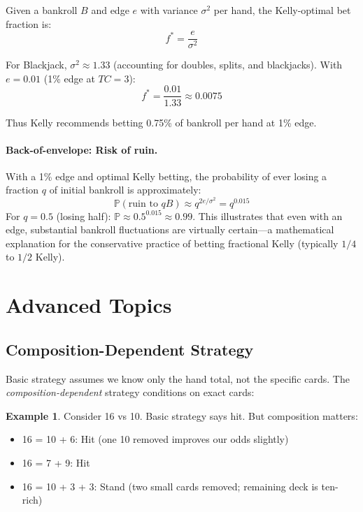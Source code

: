 \documentclass[11pt,a4paper]{article}
\theoremstyle{definition}
\newtheorem{example}[theorem]{Example}
\newcommand{\Prob}{\mathbb{P}}
\begin{document}
Given a bankroll $B$ and edge $e$ with variance $\sigma^2$ per hand, the Kelly-optimal bet fraction is:
\begin{equation}
f^* = \frac{e}{\sigma^2}
\end{equation}

For Blackjack, $\sigma^2 \approx 1.33$ (accounting for doubles, splits, and blackjacks). With $e = 0.01$ (1\% edge at $TC = 3$):
\[
f^* = \frac{0.01}{1.33} \approx 0.0075
\]

Thus Kelly recommends betting 0.75\% of bankroll per hand at 1\% edge.

\paragraph{Back-of-envelope: Risk of ruin.} With a 1\% edge and optimal Kelly betting, the probability of ever losing a fraction $q$ of initial bankroll is approximately:
\[
\Prob(\text{ruin to } qB) \approx q^{2e/\sigma^2} = q^{0.015}
\]
For $q = 0.5$ (losing half): $\Prob \approx 0.5^{0.015} \approx 0.99$. This illustrates that even with an edge, substantial bankroll fluctuations are virtually certain---a mathematical explanation for the conservative practice of betting fractional Kelly (typically $1/4$ to $1/2$ Kelly).

\section{Advanced Topics}

\subsection{Composition-Dependent Strategy}

Basic strategy assumes we know only the hand total, not the specific cards. The \textit{composition-dependent} strategy conditions on exact cards:

\begin{example}
Consider 16 vs 10. Basic strategy says hit. But composition matters:
\begin{itemize}[nosep]
\item 16 = 10 + 6: Hit (one 10 removed improves our odds slightly)
\item 16 = 7 + 9: Hit
\item 16 = 10 + 3 + 3: Stand (two small cards removed; remaining deck is ten-rich)
\end{itemize}
\end{example}
\end{document}
